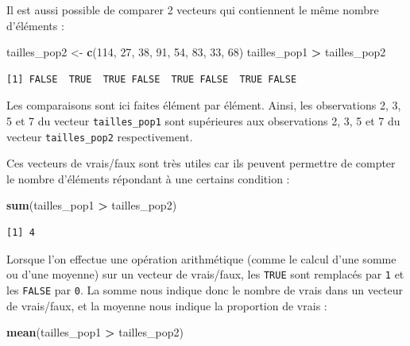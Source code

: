 \documentclass[a4paperpaper,]{article}
\newenvironment{Shaded}{\begin{snugshade}}{\end{snugshade}}
\newcommand{\KeywordTok}[1]{\textcolor[rgb]{0.13,0.29,0.53}{\textbf{#1}}}
\newcommand{\DecValTok}[1]{\textcolor[rgb]{0.00,0.00,0.81}{#1}}
\newcommand{\StringTok}[1]{\textcolor[rgb]{0.31,0.60,0.02}{#1}}
\newcommand{\OperatorTok}[1]{\textcolor[rgb]{0.81,0.36,0.00}{\textbf{#1}}}
\newcommand{\NormalTok}[1]{#1}
\theoremstyle{definition}
\theoremstyle{definition}
\theoremstyle{definition}
\theoremstyle{remark}
\begin{document}
Il est aussi possible de comparer 2 vecteurs qui contiennent le même
nombre d'éléments :

\begin{Shaded}
\begin{Highlighting}[]
\NormalTok{tailles_pop2 <-}\StringTok{ }\KeywordTok{c}\NormalTok{(}\DecValTok{114}\NormalTok{, }\DecValTok{27}\NormalTok{, }\DecValTok{38}\NormalTok{, }\DecValTok{91}\NormalTok{, }\DecValTok{54}\NormalTok{, }\DecValTok{83}\NormalTok{, }\DecValTok{33}\NormalTok{, }\DecValTok{68}\NormalTok{)}
\NormalTok{tailles_pop1 }\OperatorTok{>}\StringTok{ }\NormalTok{tailles_pop2}
\end{Highlighting}
\end{Shaded}

\begin{verbatim}
[1] FALSE  TRUE  TRUE FALSE  TRUE FALSE  TRUE FALSE
\end{verbatim}

Les comparaisons sont ici faites élément par élément. Ainsi, les
observations 2, 3, 5 et 7 du vecteur \texttt{tailles\_pop1} sont
supérieures aux observations 2, 3, 5 et 7 du vecteur
\texttt{tailles\_pop2} respectivement.

Ces vecteurs de vrais/faux sont très utiles car ils peuvent permettre de
compter le nombre d'éléments répondant à une certains condition :

\begin{Shaded}
\begin{Highlighting}[]
\KeywordTok{sum}\NormalTok{(tailles_pop1 }\OperatorTok{>}\StringTok{ }\NormalTok{tailles_pop2)}
\end{Highlighting}
\end{Shaded}

\begin{verbatim}
[1] 4
\end{verbatim}

Lorsque l'on effectue une opération arithmétique (comme le calcul d'une
somme ou d'une moyenne) sur un vecteur de vrais/faux, les \texttt{TRUE}
sont remplacés par \texttt{1} et les \texttt{FALSE} par \texttt{0}. La
somme nous indique donc le nombre de vrais dans un vecteur de
vrais/faux, et la moyenne nous indique la proportion de vrais :

\begin{Shaded}
\begin{Highlighting}[]
\KeywordTok{mean}\NormalTok{(tailles_pop1 }\OperatorTok{>}\StringTok{ }\NormalTok{tailles_pop2)}
\end{Highlighting}
\end{Shaded}
\end{document}
